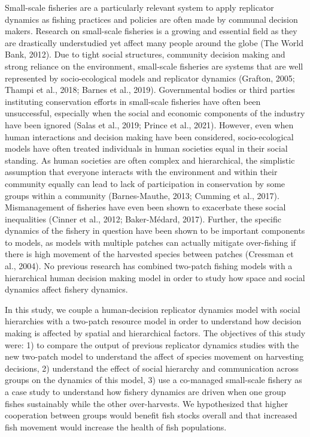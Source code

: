 \documentclass[
  12pt,
]{article}
\begin{document}
Small-scale fisheries are a particularly relevant system to apply replicator dynamics as fishing practices and policies are often made by communal decision makers. Research on small-scale fisheries is a growing and essential field as they are drastically understudied yet affect many people around the globe (The World Bank, 2012). Due to tight social structures, community decision making and strong reliance on the environment, small-scale fisheries are systems that are well represented by socio-ecological models and replicator dynamics (Grafton, 2005; Thampi et al., 2018; Barnes et al., 2019). Governmental bodies or third parties instituting conservation efforts in small-scale fisheries have often been unsuccessful, especially when the social and economic components of the industry have been ignored (Salas et al., 2019; Prince et al., 2021). However, even when human interactions and decision making have been considered, socio-ecological models have often treated individuals in human societies equal in their social standing. As human societies are often complex and hierarchical, the simplistic assumption that everyone interacts with the environment and within their community equally can lead to lack of participation in conservation by some groups within a community (Barnes-Mauthe, 2013; Cumming et al., 2017). Mismanagement of fisheries have even been shown to exacerbate these social inequalities (Cinner et al., 2012; Baker-Médard, 2017). Further, the specific dynamics of the fishery in question have been shown to be important components to models, as models with multiple patches can actually mitigate over-fishing if there is high movement of the harvested species between patches (Cressman et al., 2004). No previous research has combined two-patch fishing models with a hierarchical human decision making model in order to study how space and social dynamics affect fishery dynamics.

In this study, we couple a human-decision replicator dynamics model with social hierarchies with a two-patch resource model in order to understand how decision making is affected by spatial and hierarchical factors. The objectives of this study were: 1) to compare the output of previous replicator dynamics studies with the new two-patch model to understand the affect of species movement on harvesting decisions, 2) understand the effect of social hierarchy and communication across groups on the dynamics of this model, 3) use a co-managed small-scale fishery as a case study to understand how fishery dynamics are driven when one group fishes sustainably while the other over-harvests. We hypothesized that higher cooperation between groups would benefit fish stocks overall and that increased fish movement would increase the health of fish populations.
\end{document}
